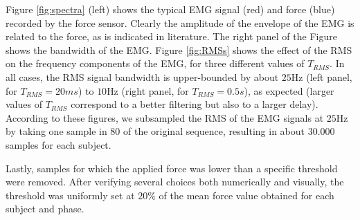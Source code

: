 \documentclass[10pt]{bmc_article}
\def\texttt{[image: ]}
\newenvironment{bmcformat}
  {\begin{raggedright}\baselineskip20pt\sloppy\setboolean{publ}{false}}
  {\end{raggedright}\baselineskip20pt\sloppy}
\begin{document}
\begin{bmcformat}


Figure \ref{fig:spectra} (left) shows the typical EMG signal (red)
and force (blue) recorded by the force sensor. Clearly the
amplitude of the envelope of the EMG is related to the force, as is
indicated in literature. The right panel of the Figure shows the bandwidth
of the EMG. Figure \ref{fig:RMSs} shows the effect of the RMS
on the frequency components of the EMG, for three different values of
$T_{RMS}$. In all cases, the RMS signal bandwidth is
upper-bounded by about $25$Hz (left panel, for $T_{RMS}=20ms$) to
$10$Hz (right panel, for $T_{RMS}=0.5s$), as expected (larger values
of $T_{RMS}$ correspond to a better filtering but also to a larger
delay). According to these figures, we subsampled the RMS of the EMG
signals at $25$Hz by taking one sample in $80$ of the original sequence,
resulting in about $30.000$ samples for each subject.

Lastly, samples for which the applied force was lower than a specific
threshold were removed. After verifying several choices both numerically
and visually, the threshold was uniformly set at $20\%$ of the mean force
value obtained for each subject and phase.


\end{bmcformat}
\end{document}
